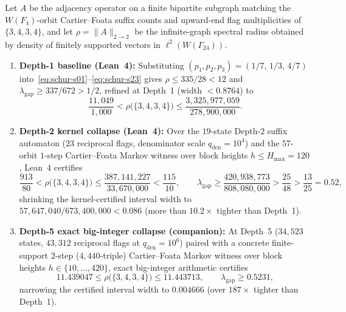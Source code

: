 \begin{theorem}
\label{thm:spectral-bracket}
Let $A$ be the adjacency operator on a finite bipartite subgraph matching the $W(F_4)$-orbit Cartier--Foata suffix counts and upward-end flag multiplicities of $\{3,4,3,4\}$, and let $\rho = \|A\|_{2\to 2}$ be the infinite-graph spectral radius obtained by density of finitely supported vectors in $\ell^2(W(\Gamma_{24}))$.
\begin{enumerate}
\item \textbf{Depth-1 baseline (Lean~4):} Substituting $(p_1, p_2, p_3) = (1/7,\, 1/3,\, 4/7)$ into~\eqref{eq:schur-s01}--\eqref{eq:schur-s23} gives $\rho \le 335/28 < 12$ and $\lambda_{\mathrm{gap}} \ge 337/672 > 1/2$, refined at Depth~1 (width $< 0.8764$) to
\begin{equation}
\label{eq:rho-depth1}
\frac{11{,}049}{1{,}000} < \rho\bigl(\{3,4,3,4\}\bigr) \le \frac{3{,}325{,}977{,}059}{278{,}900{,}000}.
\end{equation}
\item \textbf{Depth-2 kernel collapse (Lean~4):} Over the $19$-state Depth-2 suffix automaton ($23$ reciprocal flags, denominator scale $q_{\mathrm{den}} = 10^4$) and the $57$-orbit $1$-step Cartier--Foata Markov witness over block heights $h \le H_{\max} = 120$, Lean~4 certifies
\begin{equation}
\label{eq:rho-bracket}
\frac{913}{80} < \rho\bigl(\{3,4,3,4\}\bigr) \le \frac{387{,}141{,}227}{33{,}670{,}000} < \frac{115}{10},
\qquad
\lambda_{\mathrm{gap}} \ge \frac{420{,}938{,}773}{808{,}080{,}000} > \frac{25}{48} > \frac{13}{25} = 0.52,
\end{equation}
shrinking the kernel-certified interval width to $57{,}647{,}040/673{,}400{,}000 < 0.086$ (more than $10.2\times$ tighter than Depth~1).
\item \textbf{Depth-5 exact big-integer collapse (companion):} At Depth~5 ($34{,}523$ states, $43{,}312$ reciprocal flags at $q_{\mathrm{den}} = 10^6$) paired with a concrete finite-support $2$-step ($4{,}440$-triple) Cartier--Foata Markov witness over block heights $h \in \{10,\dots,420\}$, exact big-integer arithmetic certifies
\begin{equation}
\label{eq:rho-depth5}
11.439047 \le \rho\bigl(\{3,4,3,4\}\bigr) \le 11.443713, \qquad \lambda_{\mathrm{gap}} \ge 0.5231,
\end{equation}
narrowing the certified interval width to $0.004666$ (over $187\times$ tighter than Depth~1).
\end{enumerate}
\end{theorem}

